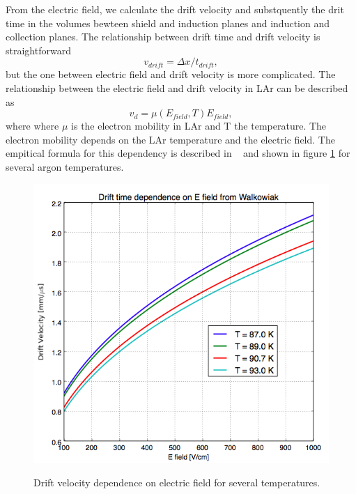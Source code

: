 From the electric field, we calculate the drift velocity and substquently the drit time in the volumes bewteen shield and induction planes and induction and collection planes.
The relationship between drift time and drift velocity is straightforward 
\begin{equation}
v_{drift} = \Delta x/t_{drift}, \label{eq:drifttime}
\end{equation}
but the one between  electric field and drift velocity is more complicated. The relationship between the electric field and drift velocity in LAr can be described as 
\begin{equation} v_{d} = \mu(E_{field},T) E_{field}, \label{eq:vd}
\end{equation}
where where $\mu$ is the electron mobility in LAr and T the temperature. The electron mobility depends on the LAr temperature and the electric field. The empitical formula for this dependency is described in ~\cite{WWW} and shown in figure \ref{fig:EV} for several argon temperatures.


\begin{figure}[ht!]
\centering
\includegraphics[scale=0.45]{./images/Walkowiak.png}\\
\caption{Drift velocity dependence on electric field for several temperatures.}
\label{fig:EV}
\end{figure}


